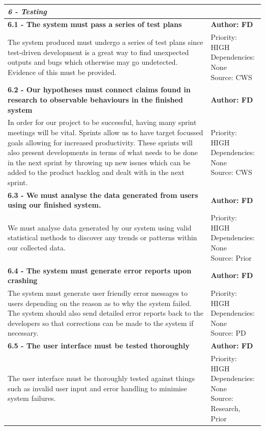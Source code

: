 \documentclass[10pt]{report}
\begin{document}
\begin{center}
\begin{longtable}{| p{13cm} | p{3cm} |}
\multicolumn{2}{|l|}{\textbf{\textit{6 - Testing}}} \\
\hline
\textbf{6.1 - The system must pass a series of test plans} & \textbf{Author: FD} \\
\hline
The system produced must undergo a series of test plans since test-driven development is a great way to find unexpected outputs and bugs which otherwise may go undetected. Evidence of this must be provided.&
\makecell{Priority: HIGH\\Dependencies: None\\Source: CWS}\\
\hline
\textbf{6.2 - Our hypotheses must connect claims found in research to observable behaviours in the finished system} & \textbf{Author: FD} \\
\hline
In order for our project to be successful, having many sprint meetings will be vital. Sprints allow us to have target focussed goals allowing for increased productivity. These sprints will also present developments in terms of what needs to be done in the next sprint by throwing up new issues which can be added to the product backlog and dealt with in the next sprint.&
\makecell{Priority: HIGH\\Dependencies: None\\Source: CWS}\\
\hline
\textbf{6.3 - We must analyse the data generated from users using our finished system.} & \textbf{Author: FD} \\
\hline
We must analyse data generated by our system using valid statistical methods to discover any trends or patterns within our collected data.&
\makecell{Priority: HIGH\\Dependencies: None\\Source: Prior}\\
\hline
\textbf{6.4 - The system must generate error reports upon crashing} & \textbf{Author: FD} \\
\hline
The system must generate user friendly error messages to users depending on the reason as to why the system failed. The system should also send detailed error reports back to the developers so that corrections can be made to the system if necessary.&
\makecell{Priority: HIGH\\Dependencies: None\\Source: PD}\\
\hline
\textbf{6.5 - The user interface must be tested thoroughly} & \textbf{Author: FD} \\
\hline
The user interface must be thoroughly tested against things such as invalid user input and error handling to minimise system failures.&
\makecell{Priority: HIGH\\Dependencies: None\\Source: Research,\\Prior}\\
\hline
\end{longtable}

\end{center}
\end{document}
